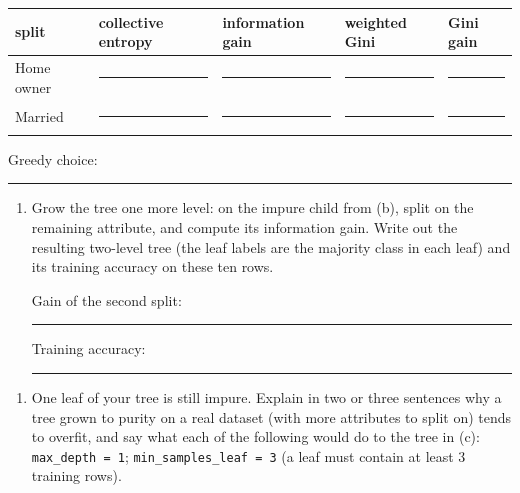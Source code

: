 \documentclass[
  11pt,
]{article}
\newcounter{none} %
\providecommand{\tightlist}{%
  \setlength{\itemsep}{0pt}\setlength{\parskip}{0pt}}
\newcommand{\answerspace}[1]{\par\vspace*{#1}}  %
\newcommand{\blank}[1][1.2in]{\rule{#1}{0.4pt}}
\begin{document}
{\def\LTcaptype{none} %
\begin{longtable}[]{@{}
  >{\raggedright\arraybackslash}p{}
  >{\raggedright\arraybackslash}p{}
  >{\raggedright\arraybackslash}p{}
  >{\raggedright\arraybackslash}p{}
  >{\raggedright\arraybackslash}p{}@{}}
\toprule\noalign{}
\begin{minipage}[b]{\linewidth}\raggedright
split
\end{minipage} & \begin{minipage}[b]{\linewidth}\raggedright
collective entropy
\end{minipage} & \begin{minipage}[b]{\linewidth}\raggedright
information gain
\end{minipage} & \begin{minipage}[b]{\linewidth}\raggedright
weighted Gini
\end{minipage} & \begin{minipage}[b]{\linewidth}\raggedright
Gini gain
\end{minipage} \\
\midrule\noalign{}
\endhead
\bottomrule\noalign{}
\endlastfoot
Home owner & \blank[0.9in] & \blank[0.9in] & \blank[0.9in] &
\blank[0.9in] \\
Married & \blank[0.9in] & \blank[0.9in] & \blank[0.9in] &
\blank[0.9in] \\
\end{longtable}
}

Greedy choice: \blank[1.2in]

\answerspace{3.5in}

\begin{enumerate}
\def\labelenumi{(\alph{enumi})}
\setcounter{enumi}{2}
\item
  Grow the tree one more level: on the impure child from (b), split on
  the remaining attribute, and compute its information gain. Write out
  the resulting two-level tree (the leaf labels are the majority class
  in each leaf) and its training accuracy on these ten rows.\nopagebreak

  Gain of the second split: \blank[0.8in]\quad Training accuracy:
  \blank[0.8in]
\end{enumerate}

\answerspace{3in}

\begin{enumerate}
\def\labelenumi{(\alph{enumi})}
\setcounter{enumi}{3}
\tightlist
\item
  One leaf of your tree is still impure. Explain in two or three
  sentences why a tree grown to purity on a real dataset (with more
  attributes to split on) tends to overfit, and say what each of the
  following would do to the tree in (c): \texttt{max\_depth\ =\ 1};
  \texttt{min\_samples\_leaf\ =\ 3} (a leaf must contain at least 3
  training rows).
\end{enumerate}
\end{document}
